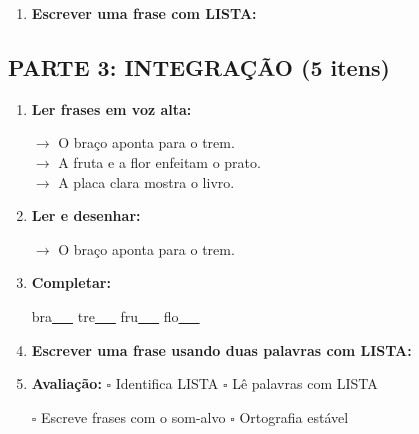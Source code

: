 \begin{exercicio}
\begin{enumerate}[resume]
  \item \textbf{Escrever uma frase com LISTA:}
  \begin{center}
  \underline{\hspace{12cm}}
  \end{center}

\end{enumerate}

\subsection*{PARTE 3: INTEGRAÇÃO (5 itens)}

\begin{enumerate}[resume]

  \item \textbf{Ler frases em voz alta:}
  \begin{center}
  $\rightarrow$ O braço aponta para o trem.\\
  $\rightarrow$ A fruta e a flor enfeitam o prato.\\
  $\rightarrow$ A placa clara mostra o livro.\\
  \end{center}

  \item \textbf{Ler e desenhar:}
  \begin{center}
  $\rightarrow$ O braço aponta para o trem.
  \end{center}
  \begin{center}
  \end{center}

  \item \textbf{Completar:}
  \begin{center}
  bra\underline{~~~} \quad tre\underline{~~~} \quad fru\underline{~~~} \quad flo\underline{~~~}
  \end{center}

  \item \textbf{Escrever uma frase usando duas palavras com LISTA:}
  \begin{center}
  \underline{\hspace{12cm}}
  \end{center}

  \item \textbf{Avaliação:} $\square$ Identifica LISTA \quad $\square$ Lê palavras com LISTA
  \begin{center}
  $\square$ Escreve frases com o som-alvo \quad $\square$ Ortografia estável
  \end{center}


\end{enumerate}
\end{exercicio}
